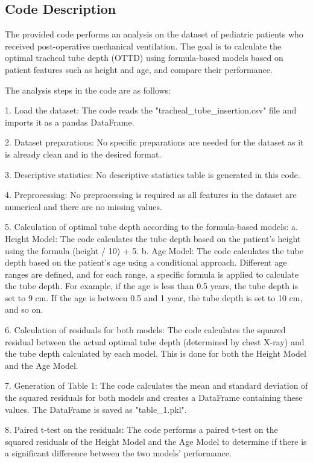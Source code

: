 \documentclass[11pt]{article}
\begin{document}
\subsection{Code Description}

The provided code performs an analysis on the dataset of pediatric patients who received post-operative mechanical ventilation. The goal is to calculate the optimal tracheal tube depth (OTTD) using formula-based models based on patient features such as height and age, and compare their performance.

The analysis steps in the code are as follows:

1. Load the dataset: The code reads the "tracheal\_tube\_insertion.csv" file and imports it as a pandas DataFrame.

2. Dataset preparations: No specific preparations are needed for the dataset as it is already clean and in the desired format.

3. Descriptive statistics: No descriptive statistics table is generated in this code.

4. Preprocessing: No preprocessing is required as all features in the dataset are numerical and there are no missing values.

5. Calculation of optimal tube depth according to the formula-based models:
   a. Height Model: The code calculates the tube depth based on the patient's height using the formula (height / 10) + 5.
   b. Age Model: The code calculates the tube depth based on the patient's age using a conditional approach. Different age ranges are defined, and for each range, a specific formula is applied to calculate the tube depth. For example, if the age is less than 0.5 years, the tube depth is set to 9 cm. If the age is between 0.5 and 1 year, the tube depth is set to 10 cm, and so on.

6. Calculation of residuals for both models: The code calculates the squared residual between the actual optimal tube depth (determined by chest X-ray) and the tube depth calculated by each model. This is done for both the Height Model and the Age Model.

7. Generation of Table 1: The code calculates the mean and standard deviation of the squared residuals for both models and creates a DataFrame containing these values. The DataFrame is saved as "table\_1.pkl".

8. Paired t-test on the residuals: The code performs a paired t-test on the squared residuals of the Height Model and the Age Model to determine if there is a significant difference between the two models' performance.
\end{document}
